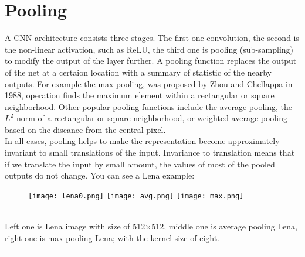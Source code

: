 \documentclass[11pt]{article}
\begin{document}
\section{Pooling}
\hspace*{1cm} A CNN architecture consists three stages. The first one convolution, the second is the non-linear activation, such as ReLU, the third one is pooling (sub-sampling) to modify the output of the layer further. A pooling function replaces the output of the net at a certaion location with a summary of statistic of the nearby outputs. For example the max pooling, was proposed by Zhou and Chellappa in 1988, operation finds the maximum element within a rectangular or square neighborhood. Other popular pooling functions include the average pooling, the $L^2$ norm of a rectangular or square neighborhood, or weighted average pooling based on the discance from the central pixel.\cite{GoodBengCour16}\\
In all cases, pooling helps to make the representation become approximately invariant to small translations of the input. Invariance to translation means that if we translate the input by small amount, the values of most of the pooled outputs do not change. You can see a Lena example:
\begin{figure}[htp]

\centering
\texttt{[image: lena0.png]}\hfill
\texttt{[image: avg.png]}\hfill
\texttt{[image: max.png]}

\caption{}
\label{fig:x}
\end{figure}\\
Left one is Lena image with size of 512$\times$512, middle one is average pooling Lena, right one is max pooling Lena; with the kernel size of eight.
\\
\par\noindent\rule{\textwidth}{0.5pt}
\end{document}
